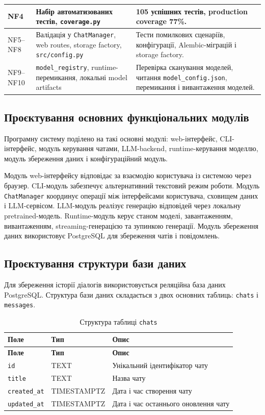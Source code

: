 \begin{longtable}{|p{2.2cm}|p{5.2cm}|p{7.2cm}|}
\hline
NF4 & Набір автоматизованих тестів, \texttt{coverage.py} & 105 успішних тестів, production coverage 77\%. \\
\hline
NF5--NF8 & Валідація у \texttt{ChatManager}, web routes, storage factory, \texttt{src/config.py} & Тести помилкових сценаріїв, конфігурації, Alembic-міграцій і storage factory. \\
\hline
NF9--NF10 & \texttt{model\_registry}, runtime-перемикання, локальні model artifacts & Перевірка сканування моделей, читання \texttt{model\_config.json}, перемикання і вивантаження моделей. \\
\hline
\end{longtable}
\normalsize

\subsection{Проєктування основних функціональних модулів}

Програмну систему поділено на такі основні модулі: web-інтерфейс, CLI-інтерфейс, модуль керування чатами, LLM-backend, runtime-керування моделлю, модуль збереження даних і конфігураційний модуль.

Модуль web-інтерфейсу відповідає за взаємодію користувача із системою через браузер. CLI-модуль забезпечує альтернативний текстовий режим роботи. Модуль \texttt{ChatManager} координує операції між інтерфейсами користувача, сховищем даних і LLM-сервісом. LLM-модуль реалізує генерацію відповідей через локальну pretrained-модель. Runtime-модуль керує станом моделі, завантаженням, вивантаженням, streaming-генерацією та зупинкою генерації. Модуль збереження даних використовує PostgreSQL для збереження чатів і повідомлень.

\subsection{Проєктування структури бази даних}

Для збереження історії діалогів використовується реляційна база даних PostgreSQL. Структура бази даних складається з двох основних таблиць: \texttt{chats} і \texttt{messages}.

\begin{longtable}{|p{4cm}|p{4cm}|p{7cm}|}
\caption{Структура таблиці \texttt{chats}}
\label{tab:chats-table}\\
\hline
\textbf{Поле} & \textbf{Тип} & \textbf{Опис} \\
\hline
\endfirsthead
\hline
\textbf{Поле} & \textbf{Тип} & \textbf{Опис} \\
\hline
\endhead
\texttt{id} & TEXT & Унікальний ідентифікатор чату \\
\hline
\texttt{title} & TEXT & Назва чату \\
\hline
\texttt{created\_at} & TIMESTAMPTZ & Дата і час створення чату \\
\hline
\texttt{updated\_at} & TIMESTAMPTZ & Дата і час останнього оновлення чату \\
\hline
\end{longtable}

